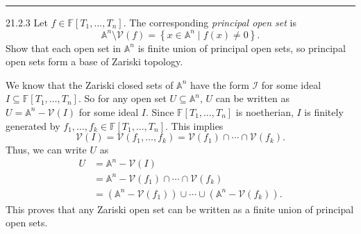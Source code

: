 \documentclass[letterpaper, 12pt]{article}
\begin{document}
\noindent\rule{7in}{2.8pt}
\begin{problem}{21.2.3}
Let \(f\in \mathbb{F}[T_1,\ldots,T_n]\). The corresponding \textit{principal open set} is 
\[\mathbb{A}^n\setminus \mathcal{V}(f)=\left\{ x\in \mathbb{A}^n\mid f(x)\neq 0 \right\}.\]
Show that each open set in \(\mathbb{A}^n\) is finite union of principal open sets, so principal open sets form a base of Zariski topology.
\end{problem}
\begin{solution}
We know that the Zariski closed sets of \(\mathbb{A}^n\) have the form \(\mathcal{I}\) for some ideal \(I\subseteq \mathbb{F}[T_1,\ldots,T_n]\). So for any open set \(U\subseteq \mathbb{A}^n\), \(U\) can be written as \(U=\mathbb{A}^n-\mathcal{V}(I)\) for some ideal \(I\). Since \(\mathbb{F}[T_1,\ldots,T_n]\) is noetherian, \(I\) is finitely generated by \(f_1,\ldots,f_k\in \mathbb{F}[T_1,\ldots,T_n]\). This implies 
\[\mathcal{V}(I)=\mathcal{V}(f_1,\ldots,f_k)=\mathcal{V}(f_1)\cap\cdots\cap \mathcal{V}(f_k).\]
Thus, we can write \(U\) as 
\begin{align*}
    U&=\mathbb{A}^n-\mathcal{V}(I)\\ 
     &=\mathbb{A}^n-\mathcal{V}(f_1)\cap \cdots\cap \mathcal{V}(f_k)\\ 
     &=(\mathbb{A}^n-\mathcal{V}(f_1))\cup \cdots\cup (\mathbb{A}^n-\mathcal{V}(f_k)).
\end{align*}
This proves that any Zariski open set can be written as a finite union of principal open sets.
\end{solution}
\end{document}
